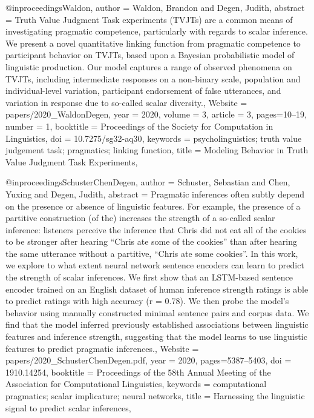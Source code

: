 {@inproceedings{Waldon,
author = {Waldon, Brandon and Degen, Judith},
abstract = {Truth Value Judgment Task experiments (TVJTs) are a common means of investigating pragmatic competence, particularly with regards to scalar inference. We present a novel quantitative linking function from pragmatic competence to participant behavior on TVJTs, based upon a Bayesian probabilistic model of linguistic production. Our model captures a range of observed phenomena on TVJTs, including intermediate responses on a non-binary scale, population and individual-level variation, participant endorsement of false utterances, and variation in response due to so-called scalar diversity.},
Website = {papers/2020_WaldonDegen},
year = {2020},
volume = {3},
article = {3},
pages={10--19},
number = {1},
booktitle = {Proceedings of the Society for Computation in Linguistics},
doi = {10.7275/sg32-aq30},
keywords = {psycholinguistics; truth value judgement task; pragmatics; linking function},
title = {{Modeling Behavior in Truth Value Judgment Task Experiments}},
}

@inproceedings{SchusterChenDegen,
author = {Schuster, Sebastian and Chen, Yuxing and Degen, Judith},
abstract = {Pragmatic inferences often subtly depend on the presence or absence of linguistic features. For example, the presence of a partitive construction (of the) increases the strength of a so-called scalar inference: listeners perceive the inference that Chris did not eat all of the cookies to be stronger after hearing “Chris ate some of the cookies” than after hearing the same utterance without a partitive, “Chris ate some cookies”. In this work, we explore to what extent neural network sentence encoders can learn to predict the strength of scalar inferences. We first show that an LSTM-based sentence encoder trained on an English dataset of human inference strength ratings is able to predict ratings with high accuracy (r = 0.78). We then probe the model’s behavior using manually constructed minimal sentence pairs and corpus data. We find that the model inferred previously established associations between linguistic features and inference strength, suggesting that the model learns to use linguistic features to predict pragmatic inferences.},
Website = {papers/2020_SchusterChenDegen.pdf},
year = {2020},
pages={5387--5403},
doi = {1910.14254},
booktitle = {Proceedings of the 58th Annual Meeting of the Association for Computational Linguistics},
keywords = {computational pragmatics; scalar implicature; neural networks},
title = {{Harnessing the linguistic signal to predict scalar inferences}},
}

}
